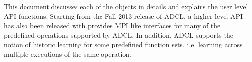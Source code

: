 This document discusses each of the objects in details and explains the user
level API functions. Starting from the Fall 2013 release of ADCL, a
higher-level API has also been released with provides MPI like interfaces for
many of the predefined operations supported by ADCL. In addition, ADCL
supports the notion of historic learning for some predefined function sets,
i.e. learning across multiple executions of the same operation.
